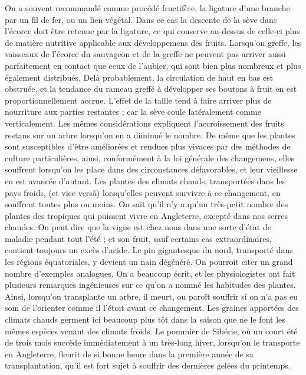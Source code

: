 On a souvent recommandé comme procédé fructifère, la ligature d’une branche par un fil de fer, ou un lien végétal. Dans ce cas la descente de la sève dans l’écorce doit être retenue par la ligature, ce qui conserve au-dessus de celle-ci plus de matière nutritive applicable aux développemens des fruits.
Lorsqu’on greffe, les vaisseaux de l’écorce du sauvageon et de la greffe ne peuvent pas arriver aussi parfaitement en contact que ceux de l’aubier, qui sont bien plus nombreux et plus également distribués. Delà probablement, la circulation de haut en bas est obstruée, et la tendance du rameau greffé à développer ses boutons à fruit en est proportionnellement accrue.
L’effet de la taille tend à faire arriver plus de nourriture aux parties restantes ; car la sève coule latéralement comme verticalement.
Les mêmes considérations expliquent l’accroissement\setcounter{page}{130} des fruits restans sur un arbre lorsqu'on en a diminué le nombre.
De même que les plantes sont susceptibles d'être améliorées et rendues plus vivaces par des méthodes de culture particulières, ainsi, conformément à la loi générale des changemens, elles souffrent lorsqu'on les place dans des circonstances défavorables, et leur vieillesse en est avancée d'autant.
Les plantes des climats chauds, transportées dans les pays froids, (et vice versâ) lorsqu'elles peuvent survivre à ce changement, en souffrent toutes plus ou moins.
On sait qu'il n'y a qu'un très-petit nombre des plantes des tropiques qui puissent vivre en Angleterre, excepté dans nos serres chaudes. On peut dire que la vigne est chez nous dans une sorte d'état de maladie pendant tout l'été ; et son fruit, sauf certains cas extraordinaires, contient toujours un excès d'acide. Le pin gigantesque du nord, transporté dans les régions équatoriales, y devient un nain dégénéré. On pourroit citer un grand nombre d'exemples analogues.
On a beaucoup écrit, et les physiologistes ont fait plusieurs remarques ingénieuses sur ce qu'on a nommé les habitudes des plantes. Ainsi, lorsqu'on transplante un arbre, il meurt, ou paroît souffrir si on n'a pas eu\setcounter{page}{131} soin de l'orienter comme il l'étoit avant ce changement. Les graines apportées des climats chauds germent ici beaucoup plus tôt dans la saison que ne le font les mêmes espèces venant des climats froids. Le pommier de Sibérie, où un court été de trois mois succède immédiatement à un très-long hiver, lorsqu'on le transporte en Angleterre, fleurit de si bonne heure dans la première année de sa transplantation, qu'il est fort sujet à souffrir des dernières gelées du printemps.
